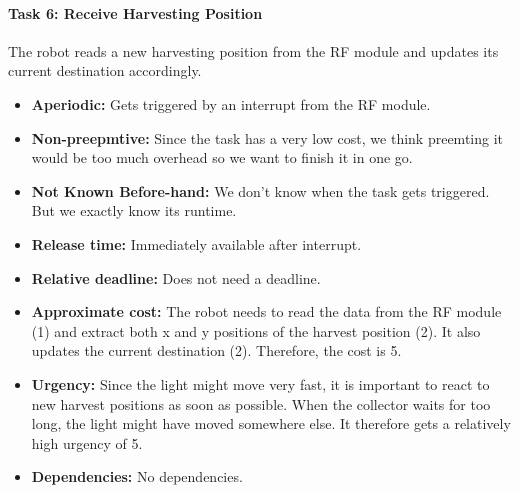 \documentclass[12pt]{article}
\begin{document}
\paragraph{Task 6: Receive Harvesting Position}
The robot reads a new harvesting position from the RF module and updates its current destination accordingly.
  \begin{itemize}
	\item \textbf{Aperiodic:} Gets triggered by an interrupt from the RF module.
	\item \textbf{Non-preepmtive:} Since the task has a very low cost, we think preemting it would be too much overhead so we want to finish it in one go.
  	\item \textbf{Not Known Before-hand:} We don't know when the task gets triggered. But we exactly know its runtime.
  	\item \textbf{Release time:} Immediately available after interrupt.
  	\item \textbf{Relative deadline:} Does not need a deadline.
  	\item \textbf{Approximate cost:} The robot needs to read the data from the RF module (1) and extract both x and y positions of the harvest position (2). It also updates the current destination (2). Therefore, the cost is 5.
  	\item \textbf{Urgency:} Since the light might move very fast, it is important to react to new harvest positions as soon as possible. When the collector waits for too long, the light might have moved somewhere else. It therefore gets a relatively high urgency of 5.
  	\item \textbf{Dependencies:} No dependencies.
   	\end{itemize}
\end{document}
